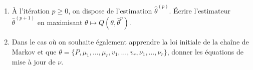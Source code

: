\documentclass[a4paper,10pt,fleqn]{article}
\newcommand{\1}{\ensuremath{\mathbbm{1}}}
\begin{document}
\begin{enumerate}
%
\item \`A l'it\'eration $p\geq 0$, on dispose de l'estimation $\hat\theta^{(p)}$. \'Ecrire l'estimateur $\hat\theta^{(p+1)}$ en maximisant $\theta\mapsto Q(\theta,\hat\theta^{p})$.%

%
\item Dans le cas o\`u on souhaite \'egalement apprendre la loi initiale de la cha\^ine de Markov et que $\theta = \{P,\mu_1,\ldots,\mu_r,v_1,\ldots,v_r,\nu_1,\ldots,\nu_r\}$, donner les \'equations de mise \`a jour de $\nu$. 

\end{enumerate}
\end{document}
